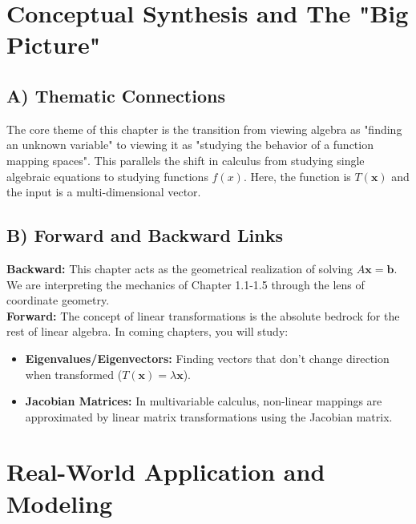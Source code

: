 \documentclass[11pt]{article}
\begin{document}
\section{Conceptual Synthesis and The "Big Picture"}

\subsection{A) Thematic Connections}
The core theme of this chapter is the transition from viewing algebra as "finding an unknown variable" to viewing it as "studying the behavior of a function mapping spaces". This parallels the shift in calculus from studying single algebraic equations to studying functions $f(x)$. Here, the function is $T(\mathbf{x})$ and the input is a multi-dimensional vector. 

\subsection{B) Forward and Backward Links}
\textbf{Backward:} This chapter acts as the geometrical realization of solving $A\mathbf{x} = \mathbf{b}$. We are interpreting the mechanics of Chapter 1.1-1.5 through the lens of coordinate geometry. \\
\textbf{Forward:} The concept of linear transformations is the absolute bedrock for the rest of linear algebra. In coming chapters, you will study:
\begin{itemize}
    \item \textbf{Eigenvalues/Eigenvectors:} Finding vectors that don't change direction when transformed ($T(\mathbf{x}) = \lambda \mathbf{x}$).
    \item \textbf{Jacobian Matrices:} In multivariable calculus, non-linear mappings are approximated by linear matrix transformations using the Jacobian matrix.
\end{itemize}

\section{Real-World Application and Modeling}
\end{document}
